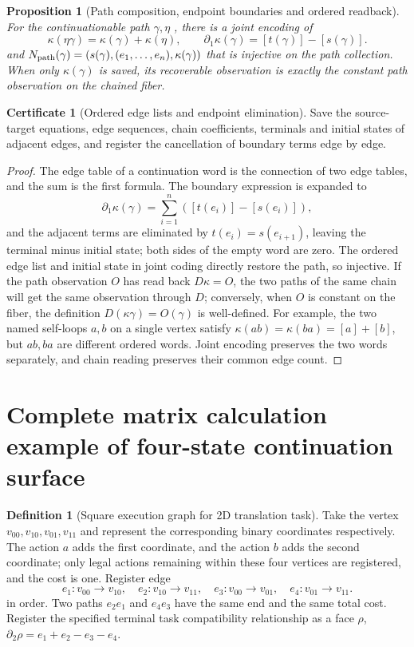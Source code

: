 \documentclass[12pt,a4paper,openany,notitlepage]{report}
\theoremstyle{plain}
\newtheorem{proposition}[theorem]{Proposition}
\theoremstyle{definition}
\newtheorem{definition}[theorem]{Definition}
\newtheorem*{certificate}{Certificate}
\theoremstyle{remark}
\def\mathcal#1{#1}\def\mathsf#1{#1}\def\mathbb#1{#1}%
\begin{document}
\begin{CJK*}
\begin{proposition}
[Path composition, endpoint boundaries and ordered readback]\label{exp:task:word-chain}
For the continuationable path $\gamma,\eta$ , there is a joint encoding of \[
 \kappa(\eta\gamma)=\kappa(\gamma)+\kappa(\eta),\qquad
 \partial_1\kappa(\gamma)=[t(\gamma)]-[s(\gamma)].
\] and $\mathcal N_{\rm path}(\gamma)=(s(\gamma),(e_1,\ldots,e_n),\kappa(\gamma))$ that is injective on the path collection. When only $\kappa(\gamma)$ is saved, its recoverable observation is exactly the constant path observation on the chained fiber.\end{proposition}
\begin{certificate}
[Ordered edge lists and endpoint elimination]Save the source-target equations, edge sequences, chain coefficients, terminals and initial states of adjacent edges, and register the cancellation of boundary terms edge by edge.\end{certificate}
\begin{proof}
The edge table of a continuation word is the connection of two edge tables, and the sum is the first formula. The boundary expression is expanded to \[
 \partial_1\kappa(\gamma)
 =\sum_{i=1}^{n}([t(e_i)]-[s(e_i)]),
\] and the adjacent terms are eliminated by $t(e_i)=s(e_{i+1})$, leaving the terminal minus initial state; both sides of the empty word are zero. The ordered edge list and initial state in joint coding directly restore the path, so injective. If the path observation $O$ has read back $D\kappa=O$, the two paths of the same chain will get the same observation through $D$; conversely, when $O$ is constant on the fiber, the definition $D(\kappa\gamma)=O(\gamma)$ is well-defined. For example, the two named self-loops $a,b$ on a single vertex satisfy $\kappa(ab)=\kappa(ba)=[a]+[b]$, but $ab,ba$ are different ordered words. Joint encoding preserves the two words separately, and chain reading preserves their common edge count.\end{proof}


\section { Complete matrix calculation example of four-state continuation surface }

\begin{definition}
[Square execution graph for 2D translation task]\label{exp:task:square}
Take the vertex $v_{00},v_{10},v_{01},v_{11}$ and represent the corresponding binary coordinates respectively. The action $a$ adds the first coordinate, and the action $b$ adds the second coordinate; only legal actions remaining within these four vertices are registered, and the cost is one. Register edge \[
 e_1:v_{00}\to v_{10},\quad e_2:v_{10}\to v_{11},\quad
 e_3:v_{00}\to v_{01},\quad e_4:v_{01}\to v_{11}.
\] in order. Two paths $e_2e_1$ and $e_4e_3$ have the same end and the same total cost. Register the specified terminal task compatibility relationship as a face $\rho$, $\partial_2\rho=e_1+e_2-e_3-e_4$.\end{definition}



\end{CJK*}
\end{document}
